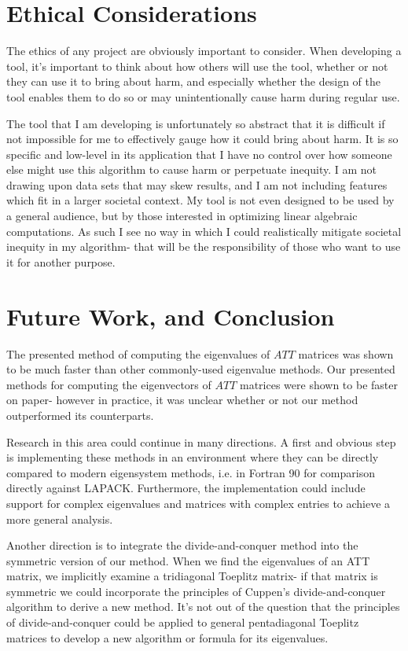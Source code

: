 \documentclass[10pt,twocolumn]{article}
\begin{document}
\section{Ethical Considerations}

The ethics of any project are obviously important to consider. When developing a tool, it's important to think about how others will use the tool, whether or not they can use it to bring about harm, and especially whether the design of the tool enables them to do so or may unintentionally cause harm during regular use. 

The tool that I am developing is unfortunately so abstract that it is difficult if not impossible for me to effectively gauge how it could bring about harm. It is so specific and low-level in its application that I have no control over how someone else might use this algorithm to cause harm or perpetuate inequity. I am not drawing upon data sets that may skew results, and I am not including features which fit in a larger societal context. My tool is not even designed to be used by a general audience, but by those interested in optimizing linear algebraic computations. As such I see no way in which I could realistically mitigate societal inequity in my algorithm- that will be the responsibility of those who want to use it for another purpose.

\section{Future Work, and Conclusion}

The presented method of computing the eigenvalues of $ATT$ matrices was shown to be much faster than other commonly-used eigenvalue methods. Our presented methods for computing the eigenvectors of $ATT$ matrices were shown to be faster on paper- however in practice, it was unclear whether or not our method outperformed its counterparts. 

Research in this area could continue in many directions. A first and obvious step is implementing these methods in an environment where they can be directly compared to modern eigensystem methods, i.e. in Fortran 90 for comparison directly against LAPACK. Furthermore, the implementation could include support for complex eigenvalues and matrices with complex entries to achieve a more general analysis.

Another direction is to integrate the divide-and-conquer method into the symmetric version of our method. When we find the eigenvalues of an ATT matrix, we implicitly examine a tridiagonal Toeplitz matrix- if that matrix is symmetric we could incorporate the principles of Cuppen's divide-and-conquer algorithm to derive a new method. It's not out of the question that the principles of divide-and-conquer could be applied to general pentadiagonal Toeplitz matrices to develop a new algorithm or formula for its eigenvalues.
\end{document}
